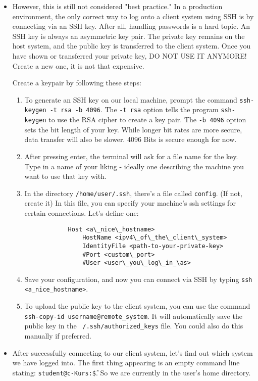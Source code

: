 \documentclass{dcbl/challenge}
\begin{document}
\begin{aufgabe}
\begin{itemize}
    \item However, this is still not considered "best practice." In a production environment, the only correct way to log onto a client system using SSH is by connecting via an SSH key. After all, handling passwords is a hard topic. An SSH key is always an asymmetric key pair. The private key remains on the host system, and the public key is transferred to the client system. Once you have shown or transferred your private key, DO NOT USE IT ANYMORE! Create a new one, it is not that expensive.
    
    Create a keypair by following these steps:
    \begin{enumerate}
        \item To generate an SSH key on our local machine, prompt the command \texttt{ssh-keygen -t rsa -b 4096}. The \texttt{-t rsa} option tells the program \texttt{ssh-keygen} to use the RSA cipher to create a key pair. The \texttt{-b 4096} option sets the bit length of your key. While longer bit rates are more secure, data transfer will also be slower. 4096 Bits is secure enough for now.
        \item After pressing enter, the terminal will ask for a file name for the key. Type in a name of your liking - ideally one describing the machine you want to use that key with.
        \item In the directory \texttt{/home/user/.ssh}, there's a file called \texttt{config}. (If not, create it) In this file, you can specify your machine's ssh settings for certain connections. Let's define one:
        \begin{lstlisting}
            Host <a\_nice\_hostname>
                HostName <ipv4\_of\_the\_client\_system>
                IdentityFile <path-to-your-private-key>
                #Port <custom\_port>
                #User <user\_you\_log\_in_\as>
        \end{lstlisting}
        \item Save your configuration, and now you can connect via SSH by typing \texttt{ssh <a\_nice\_hostname>}.
        \item To upload the public key to the client system, you can use the command \texttt{ssh-copy-id username@remote_system}. It will automatically save the public key in the \texttt{~/.ssh/authorized\_keys} file. You could also do this manually if preferred.
    \end{enumerate}

    \item After successfully connecting to our client system, let's find out which system we have logged into. The first thing appearing is an empty command line stating: \texttt{student@c-Kurs:\~\$}. So we are currently in the user's home directory.
    

\end{itemize}
\end{aufgabe}
\end{document}
